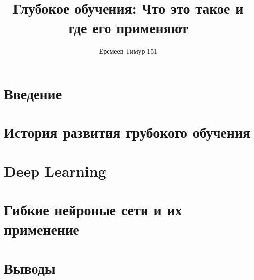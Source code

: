 \documentclass[a4paper, 12pt]{article}
\begin{document}
    \title{Глубокое обучения: Что это такое и где его применяют}
    \author{Еремеев Тимур 151}
    \date{}

    \maketitle

    \tableofcontents

    \section*{Введение}    
    

    \section*{История развития грубокого обучения}
    

    \section*{Deep Learning}
    

    \section*{Гибкие нейроные сети и их применение}
    

    \section*{Выводы}
    
\end{document}
